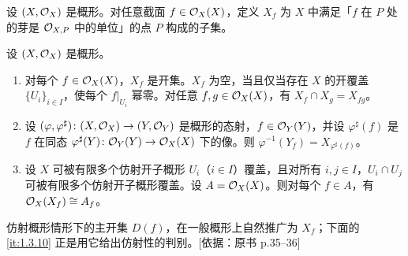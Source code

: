 设 $(X,\mathcal{O}_X)$ 是概形。对任意截面 $f\in \mathcal{O}_X(X)$，定义 $X_f$ 为 $X$ 中满足「$f$ 在 $P$ 处的芽是 $\mathcal{O}_{X,P}$ 中的单位」的点 $P$ 构成的子集。

\begin{proposition}\label{it:1.3.9}
设 $(X,\mathcal{O}_X)$ 是概形。
\begin{enumerate}[label=(\roman*),leftmargin=2.8em]
  \item 对每个 $f\in \mathcal{O}_X(X)$，$X_f$ 是开集。$X_f$ 为空，当且仅当存在 $X$ 的开覆盖 $\{U_i\}_{i\in I}$，使每个 $f|_{U_i}$ 幂零。对任意 $f,g\in \mathcal{O}_X(X)$，有 $X_f\cap X_g=X_{fg}$。
  \item 设 $(\varphi,\varphi^\sharp)\colon (X,\mathcal{O}_X)\to (Y,\mathcal{O}_Y)$ 是概形的态射，$f\in \mathcal{O}_Y(Y)$，并设 $\varphi^\sharp(f)$ 是 $f$ 在同态 $\varphi^\sharp(Y)\colon \mathcal{O}_Y(Y)\to \mathcal{O}_X(X)$ 下的像。则 $\varphi^{-1}(Y_f)=X_{\varphi^\sharp(f)}$。
  \item 设 $X$ 可被有限多个仿射开子概形 $U_i$（$i\in I$）覆盖，且对所有 $i,j\in I$，$U_i\cap U_j$ 可被有限多个仿射开子概形覆盖。设 $A=\mathcal{O}_X(X)$。则对每个 $f\in A$，有 $\mathcal{O}_X(X_f)\cong A_f$。
\end{enumerate}
\end{proposition}

\begin{tnote}
仿射概形情形下的主开集 $D(f)$，在一般概形上自然推广为 $X_f$；下面的 \ref{it:1.3.10} 正是用它给出仿射性的判别。[依据：原书 p.35–36]
\end{tnote}

